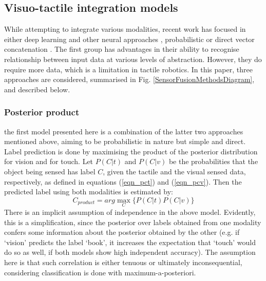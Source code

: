 \documentclass[letterpaper, 10 pt, conference]{ieeeconf}  %
\begin{document}
\subsection{Visuo-tactile integration models}
\label{sec_visuotactilemodels}
While attempting to integrate various modalities, recent work has focused in either deep learning and other neural approaches \cite{NIPS2012_4683,Wu2013a,Schmitz2014}, probabilistic \cite{Liu2012a} or direct vector concatenation \cite{Yang2015}. The first group has advantages in their ability to recognise relationship between input data at various levels of abstraction. However, they do require more data, which is a limitation in tactile robotics. In this paper, three approaches are considered, summarised in Fig. \ref{SensorFusionMethodsDiagram}, and described below.

\begin{figure}
	\centering
	\end{figure}

\subsubsection{Posterior product}
the first model presented here is a combination of the latter two approaches mentioned above, aiming to be probabilistic in nature but simple and direct. Label prediction is done by maximising the product of the posterior distribution for vision and for touch. Let $P(C|t)$ and $P(C|v)$ be the probabilities that the object being sensed has label $C$, given the tactile and the visual sensed data, respectively, as defined in equations (\ref{eqn_pct}) and (\ref{eqn_pcv}). Then the predicted label using both modalities is estimated by:
\begin{equation}
C_{product} = arg\max_C\{P(C|t)P(C|v)\}
\end{equation}
There is an implicit assumption of independence in the above model. Evidently, this is a simplification, since the posterior over labels obtained from one modality confers some information about the posterior obtained by the other (e.g. if `vision' predicts the label `book', it increases the expectation that `touch' would do so as well, if both models show high independent accuracy). The assumption here is that such correlation is either tenuous or ultimately inconsequential, considering classification is done with maximum-a-posteriori.
\end{document}
